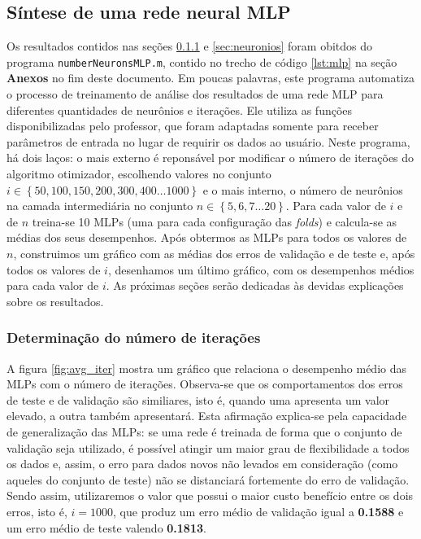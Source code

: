 \subsection{Síntese de uma rede neural MLP}
\label{sec:mlp}

Os resultados contidos nas seções \ref{sec:iteracoes} e \ref{sec:neuronios}
foram obitdos do programa \texttt{numberNeuronsMLP.m}, contido no trecho de
código \ref{lst:mlp} na seção \textbf{Anexos} no fim deste documento. Em poucas
palavras, este programa automatiza o processo de treinamento de análise dos
resultados de uma rede MLP para diferentes quantidades de neurônios e iterações.
Ele utiliza as funções disponibilizadas pelo professor, que foram adaptadas
somente para receber parâmetros de entrada no lugar de requirir os dados ao
usuário. Neste programa, há dois laços: o mais externo é reponsável por
modificar o número de iterações do algoritmo otimizador, escolhendo valores no
conjunto \(i \in \left\{ 50, 100, 150, 200, 300, 400 \dots 1000 \right\} \) e o
mais interno, o número de neurônios na camada intermediária no conjunto \( n \in
\left\{ 5, 6, 7 \dots 20 \right\} \). Para cada valor de \(i\) e de \(n\)
treina-se 10 MLPs (uma para cada configuração das \textit{folds}) e calcula-se
as médias dos seus desempenhos. Após obtermos as MLPs para todos os valores de \(n\), construimos
um gráfico com as médias dos erros de validação e de teste e, após todos os
valores de \(i\), desenhamos um último gráfico, com os desempenhos médios para
cada valor de \(i\). As próximas seções serão dedicadas às devidas explicações
sobre os resultados.

\subsubsection{Determinação do número de iterações}
\label{sec:iteracoes}

A figura \ref{fig:avg_iter} mostra um gráfico que relaciona o desempenho médio
das MLPs com o número de iterações. Observa-se que os comportamentos dos erros
de teste e de validação são similiares, isto é, quando uma apresenta um valor
elevado, a outra também apresentará. Esta afirmação explica-se pela capacidade
de generalização das MLPs: se uma rede é treinada de forma que o conjunto de
validação seja utilizado, é possível atingir um maior grau de flexibilidade a
todos os dados e, assim, o erro para dados novos não levados em consideração
(como aqueles do conjunto de teste) não se distanciará fortemente do erro de
validação. Sendo assim, utilizaremos o valor que possui o maior custo benefício
entre os dois erros, isto é, \(i = 1000\), que produz um erro médio de validação
igual a \textbf{0.1588} e um erro médio de teste valendo \textbf{0.1813}.

